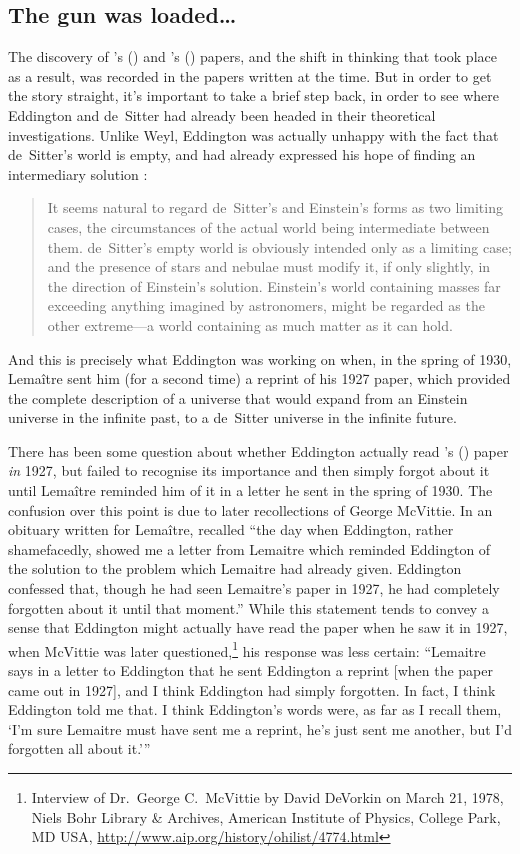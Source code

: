 \documentclass[12 pt]{article}
\def\citeapos#1{\citeauthor{#1}'s (\citeyear{#1})}
\begin{document}
\subsection{The gun was loaded\ldots}
\label{sec:4.1}
The discovery of \citeapos{Friedmann1922} and \citeapos{Lemaitre1927} papers, and the shift in thinking that took place as a result, was recorded in the papers written at the time. But in order to get the story straight, it's important to take a brief step back, in order to see where Eddington and de~Sitter had already been headed in their theoretical investigations. Unlike Weyl, Eddington was actually unhappy with the fact that de~Sitter's world is empty, and had already expressed his hope of finding an intermediary solution \citep{Eddington1923}: 
\begin{quote}
It seems natural to regard de~Sitter's and Einstein's forms as two limiting cases, the circumstances of the actual world being intermediate between them. de~Sitter's empty world is obviously intended only as a limiting case; and the presence of stars and nebulae must modify it, if only slightly, in the direction of Einstein's solution. Einstein's world containing masses far exceeding anything imagined by astronomers, might be regarded as the other extreme---a world containing as much matter as it can hold.
\end{quote}
And this is precisely what Eddington was working on when, in the spring of 1930, Lema\^{i}tre sent him (for a second time) a reprint of his 1927 paper, which provided the complete description of a universe that would expand from an Einstein universe in the infinite past, to a de~Sitter universe in the infinite future.

There has been some question about whether Eddington actually read \citeapos{Lemaitre1927} paper \textit{in} 1927, but failed to recognise its importance and then simply forgot about it until Lema\^{i}tre reminded him of it in a letter he sent in the spring of 1930. The confusion over this point is due to later recollections of George McVittie. In an obituary written for Lema\^{i}tre, \citet{McVittie1967} recalled ``the day when Eddington, rather shamefacedly, showed me a letter from Lemaitre which reminded Eddington of the solution to the problem which Lemaitre had already given. Eddington confessed that, though he had seen Lemaitre's paper in 1927, he had completely forgotten about it until that moment.'' While this statement tends to convey a sense that Eddington might actually have read the paper when he saw it in 1927, when McVittie was later questioned,\footnote{Interview of Dr.\ George C.\ McVittie by David DeVorkin on March 21, 1978, Niels Bohr Library \& Archives, American Institute of Physics, College Park, MD USA, \url{http://www.aip.org/history/ohilist/4774.html}} his response was less certain: ``Lemaitre says in a letter to Eddington that he sent Eddington a reprint [when the paper came out in 1927], and I think Eddington had simply forgotten. In fact, I think Eddington told me that. I think Eddington's words were, as far as I recall them, `I'm sure Lemaitre must have sent me a reprint, he's just sent me another, but I'd forgotten all about it.'{''} 
\end{document}
